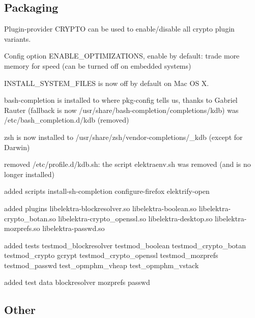 \subsection*{Packaging}


\begin{DoxyItemize}
\item Plugin-\/provider {\ttfamily C\+R\+Y\+P\+T\+O} can be used to enable/disable all crypto plugin variants.
\item Config option {\ttfamily E\+N\+A\+B\+L\+E\+\_\+\+O\+P\+T\+I\+M\+I\+Z\+A\+T\+I\+O\+N\+S}, enable by default\+: trade more memory for speed (can be turned off on embedded systems)
\item {\ttfamily I\+N\+S\+T\+A\+L\+L\+\_\+\+S\+Y\+S\+T\+E\+M\+\_\+\+F\+I\+L\+E\+S} is now off by default on Mac O\+S X.
\item bash-\/completion is installed to where pkg-\/config tells us, thanks to Gabriel Rauter (fallback is now {\ttfamily /usr/share/bash-\/completion/completions/kdb}) was {\ttfamily /etc/bash\+\_\+completion.d/kdb} (removed)
\item zsh is now installed to {\ttfamily /usr/share/zsh/vendor-\/completions/\+\_\+kdb} (except for Darwin)
\item removed /etc/profile.d/kdb.\+sh\+: the script {\ttfamily elektraenv.\+sh} was removed (and is no longer installed)
\item added scripts install-\/sh-\/completion configure-\/firefox elektrify-\/open
\item added plugins libelektra-\/blockresolver.\+so libelektra-\/boolean.\+so libelektra-\/crypto\+\_\+botan.\+so libelektra-\/crypto\+\_\+openssl.\+so libelektra-\/desktop.\+so libelektra-\/mozprefs.\+so libelektra-\/passwd.\+so
\item added tests testmod\+\_\+blockresolver testmod\+\_\+boolean testmod\+\_\+crypto\+\_\+botan testmod\+\_\+crypto gcrypt testmod\+\_\+crypto\+\_\+openssl testmod\+\_\+mozprefs testmod\+\_\+passwd test\+\_\+opmphm\+\_\+vheap test\+\_\+opmphm\+\_\+vstack
\item added test data blockresolver mozprefs passwd
\end{DoxyItemize}

\subsection*{Other}


